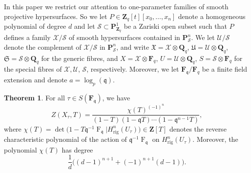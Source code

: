 \documentclass[a4paper,11pt]{article}
\numberwithin{equation}{section}
\newcommand{\ZZ}{\mathbf{Z}} %
\newcommand{\QQ}{\mathbf{Q}} %
\newcommand{\FF}{\mathbf{F}} %
\DeclareMathOperator{\Frob}{F}           %
\providecommand{\Hrig}{H_{\text{rig}}}  %
\theoremstyle{definition}
\newtheorem{thm}{Theorem}[section]
\newtheorem{rem}[thm]{Remark}
\begin{document}
In this paper we restrict our attention to one-parameter families of smooth 
projective hypersurfaces. So we let $P \in \ZZ_q[t][x_0,\dotsc,x_n]$ denote 
a homogeneous polynomial of degree $d$ and let 
$\mathcal{S} \subset \mathbf{P}^1_{\ZZ_q}$ be a Zariski open subset such that 
$P$ defines a family $\mathcal{X}/\mathcal{S}$ of smooth hypersurfaces contained 
in $\mathbf{P}^n_{\mathcal{S}}$. 
We let $\mathcal{U}/\mathcal{S}$ 
denote the complement of $\mathcal{X}/\mathcal{S}$ in $\mathbf{P}^n_{\mathcal{S}}$,
and write $\mathfrak{X}=\mathcal{X} \otimes \QQ_q$, 
$\mathfrak{U}=\mathcal{U} \otimes \QQ_q$, $\mathfrak{S}=\mathcal{S} \otimes \QQ_q$
for the generic fibres, and $X=\mathcal{X} \otimes \FF_q$, 
$U=\mathcal{U} \otimes \QQ_q$, $S=\mathcal{S} \otimes \FF_q$ for the special 
fibres of $\mathcal{X},\mathcal{U}$, $\mathcal{S}$, respectively. Moreover, 
we let $\FF_{\mathfrak{q}}/\FF_q$ be a finite field extension and 
denote $a=\log_p(\mathfrak{q})$.

\begin{thm} \label{thm:hypersurface} 
For all $\tau \in S(\FF_{\mathfrak{q}})$, we have
\begin{equation} \label{eq:formulazeta}
Z(X_{\tau},T) = \frac{\chi(T)^{(-1)^n}}{(1 - T) (1 - \mathfrak{q}T) \dotsm (1 - \mathfrak{q}^{n-1}T)},
\end{equation}
where 
$\chi(T) = \det \bigl( 1 - T \mathfrak{q}^{-1} \Frob_{\mathfrak{q}} | \Hrig^n(U_{\tau}) \bigr) \in \ZZ[T]$
denotes the reverse characteristic polynomial of the action of 
$\mathfrak{q}^{-1} \Frob_{\mathfrak{q}}$ on $\Hrig^n(U_{\tau})$. 
Moreover, the polynomial $\chi(T)$ has degree 
\begin{equation} \label{eq:formulab}
\frac{1}{d} \bigl((d-1)^{n+1} + (-1)^{n+1}(d-1) \bigr).
\end{equation}
\end{thm}
\end{document}
